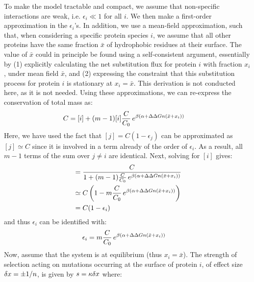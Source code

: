 To make the model tractable and compact, we assume that non-specific interactions are weak, i.e. $\epsilon_i \ll 1$ for all $i$.
We then make a first-order approximation in the $\epsilon_i$'s.
In addition, we use a mean-field approximation, such that, when considering a specific protein species $i$, we assume that all other proteins have the same fraction $\bar x$ of hydrophobic residues at their surface.
The value of $\bar x$ could in principle be found using a self-consistent argument, essentially by (1) explicitly calculating the net substitution flux for protein $i$ with fraction $x_i$, under mean field $\bar x$, and (2) expressing the constraint that this substitution process for protein $i$ is stationary at $x_i = \bar x$.
This derivation is not conducted here, as it is not needed.
Using these approximations, we can re-express the conservation of total mass as:
\begin{align}
    C & = [i] + (m-1) [i] \frac{C}{C_0} \, e^{\beta (\alpha + \Delta \Delta G n (\bar x + x_i))}
\end{align}
Here, we have used the fact that $[j] = C(1 - \epsilon_j)$ can be approximated as $[j] \simeq C$ since it is involved in a term already of the order of $\epsilon_i$. As a result, all $m-1$ terms of the sum over $j\neq i$ are identical.
Next, solving for $[i]$ gives:
\begin{align}
[i]
    & = \frac{C} {1 + (m-1) \frac{C}{C_0} \, e^{\beta (\DeltaGmin + \DeltaDeltaG \NbrSites (\bar x + x_i))}}
    \\ & \simeq C \left( 1 - m \frac{C}{C_0} \, e^{\beta (\DeltaGmin + \DeltaDeltaG \NbrSites (\bar x + x_i))} \right)
    \\ & =
    C (1 - \epsilon_i)
\end{align}
and thus $\epsilon_i$ can be identified with:
\begin{align}
    \epsilon_i  & = m \frac{C}{C_0} \, e^{\beta (\alpha +\Delta \Delta G n (\bar x + x_i))}
\end{align}
Now, assume that the system is at equilibrium (thus $x_i = \bar x$).
The strength of selection acting on mutations occurring at the surface of protein $i$, of effect size $\delta x = \pm 1/n$, is given by $s = \kappa \delta x$ where:

